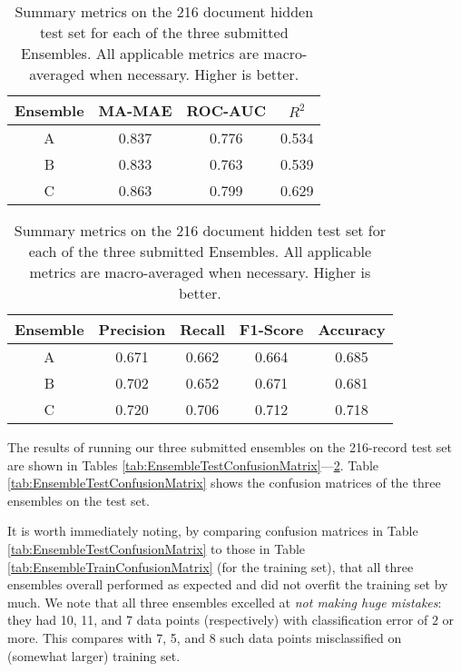 \begin{table}
\centering
    \begin{tabular}{|c|c|c|c|}
        \hline
        \textsf{ Ensemble } & \textsf{ MA-MAE } & \textsf{ ROC-AUC } & \textsf{ $R^2$ } \\
        \hline
       \cellcolor{gray!15} \textsf{ A } & 0.837 & 0.776 & 0.534 \\ 
       \cellcolor{gray!15} \textsf{ B } & 0.833 & 0.763 & 0.539 \\ 
       \cellcolor{gray!15} \textsf{ C } & \cellcolor{gray!15} 0.863 & \cellcolor{gray!15} 0.799 & \cellcolor{gray!15} 0.629 \\ 
       \hline
    \end{tabular}
    \caption{Summary metrics on the 216 document hidden test set for each of the three submitted Ensembles. All applicable metrics are macro-averaged when necessary. Higher is better.}
    \label{tab:EnsembleTestSummaryMetrics1}
\end{table}

\begin{table}
\centering
    \begin{tabular}{|c|c|c|c|c|}
        \hline
        \textsf{ Ensemble } & \textsf{ Precision } & \textsf{ Recall } & \textsf{ F1-Score } & \textsf{ Accuracy } \\
        \hline
       \cellcolor{gray!15} \textsf{ A } & 0.671 & 0.662 & 0.664 & 0.685 \\ 
       \cellcolor{gray!15} \textsf{ B } & 0.702 & 0.652 & 0.671 & 0.681 \\ 
       \cellcolor{gray!15} \textsf{ C } & \cellcolor{gray!15} 0.720 & \cellcolor{gray!15} 0.706 & \cellcolor{gray!15} 0.712 & \cellcolor{gray!15} 0.718 \\ 
        \hline
    \end{tabular}
    \caption{Summary metrics on the 216 document hidden test set for each of the three submitted Ensembles. All applicable metrics are macro-averaged when necessary. Higher is better.}
    \label{tab:EnsembleTestSummaryMetrics2}
\end{table}



The results of running our three submitted ensembles on the
216-record test set are shown in Tables \ref{tab:EnsembleTestConfusionMatrix}---\ref{tab:EnsembleTestSummaryMetrics2}.
Table \ref{tab:EnsembleTestConfusionMatrix} shows the confusion
matrices of the three ensembles on the test set.

It is worth immediately noting, by comparing confusion
matrices in  Table \ref{tab:EnsembleTestConfusionMatrix}
to those in Table \ref{tab:EnsembleTrainConfusionMatrix}
(for the training set), that all three ensembles overall
performed as expected and did not overfit the training
set by much.  We note that all three ensembles
 excelled at \textit{not making huge mistakes}:
they had 10, 11, and 7 data points (respectively) with classification
error of $2$ or more. This compares with 7, 5, and 8 such
data points misclassified on (somewhat larger) training set.

